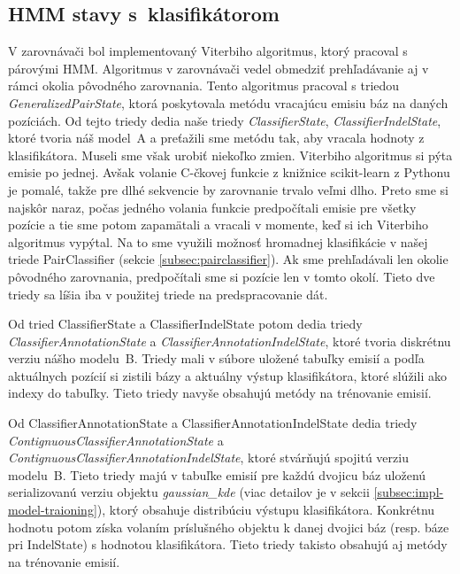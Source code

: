 \subsection{HMM stavy s~klasifikátorom}
\label{subsec:hmm-states}

V zarovnávači bol implementovaný Viterbiho algoritmus, ktorý pracoval s párovými HMM. Algoritmus v zarovnávači vedel obmedziť prehľadávanie aj v rámci okolia pôvodného zarovnania. Tento algoritmus pracoval s triedou \textit{GeneralizedPairState}, ktorá poskytovala metódu  vracajúcu emisiu báz na daných pozíciách. Od tejto triedy dedia naše triedy \textit{ClassifierState}, \textit{ClassifierIndelState}, ktoré tvoria náš model~A a preťažili sme metódu  tak, aby vracala hodnoty z klasifikátora. Museli sme však urobiť niekoľko zmien. Viterbiho algoritmus si pýta emisie po jednej. Avšak volanie C-čkovej funkcie z knižnice scikit-learn z Pythonu je pomalé, takže pre dlhé sekvencie by zarovnanie trvalo veľmi dlho. Preto sme si najskôr naraz, počas jedného volania funkcie predpočítali emisie pre všetky pozície a tie sme potom zapamätali a vracali v momente, keď si ich Viterbiho algoritmus vypýtal. Na to sme využili možnosť hromadnej klasifikácie v našej triede PairClassifier (sekcie \ref{subsec:pairclassifier}). Ak sme prehľadávali len okolie pôvodného zarovnania, predpočítali sme si pozície len v tomto okolí. Tieto dve triedy sa líšia iba v použitej triede na predspracovanie dát.

Od tried ClassifierState a ClassifierIndelState potom dedia triedy \textit{ClassifierAnnotationState} a \textit{ClassifierAnnotationIndelState}, ktoré tvoria diskrétnu verziu nášho modelu~B. Triedy mali v súbore uložené tabuľky emisií a podľa aktuálnych pozícií si zistili bázy a aktuálny výstup klasifikátora, ktoré slúžili ako indexy do tabuľky. Tieto triedy navyše obsahujú metódy na trénovanie emisií.

Od ClassifierAnnotationState a ClassifierAnnotationIndelState dedia triedy \textit{ContignuousClassifierAnnotationState} a \textit{ContignuousClassifierAnnotationIndelState}, ktoré stvárňujú spojitú verziu modelu~B. Tieto triedy majú v tabuľke emisií pre každú dvojicu báz uloženú serializovanú verziu objektu \textit{gaussian\_kde} (viac detailov je v sekcii \ref{subsec:impl-model-traioning}), ktorý obsahuje distribúciu výstupu klasifikátora. Konkrétnu hodnotu potom získa volaním príslušného objektu k danej dvojici báz (resp. báze pri IndelState) s hodnotou klasifikátora. Tieto triedy takisto obsahujú aj metódy na trénovanie emisií.

